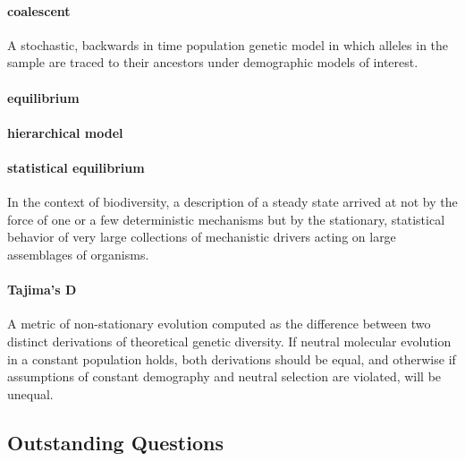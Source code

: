 \documentclass[12pt]{article}
\begin{document}
\paragraph{coalescent} A stochastic, backwards in time population genetic model 
in which alleles in the sample are traced to their ancestors under demographic models of interest.

\paragraph{equilibrium}

\paragraph{hierarchical model}

\paragraph{statistical equilibrium} In the context of biodiversity, a
description of a steady state arrived at not by the force of one or a
few deterministic mechanisms but by the stationary, statistical
behavior of very large collections of mechanistic drivers acting on
large assemblages of organisms.

\paragraph{Tajima's D} A metric of non-stationary evolution computed
as the difference between two distinct derivations of theoretical
genetic diversity. If neutral molecular evolution in a constant
population holds, both derivations should be equal, and otherwise if
assumptions of constant demography and neutral selection are violated,
will be unequal.

\subsection*{Outstanding Questions}
\end{document}
